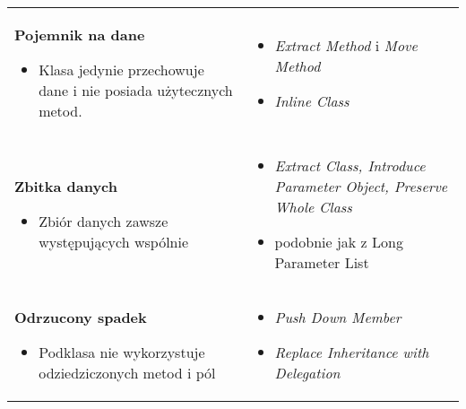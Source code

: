 \documentclass[../main.tex]{subfiles}
\begin{document}
    \begin{table}[H]
        \begin{center}
            \begin{tabular}{ p{.35\linewidth} p{.65\linewidth}}

                \cmidrule(r){1-1}\cmidrule(l){2-2}
                \textbf{Pojemnik na dane}
                \begin{itemize}
                    \item Klasa jedynie przechowuje dane i nie posiada użytecznych metod.
                \end{itemize}
                &
                \begin{itemize}
                    \item \textit{Extract Method} i \textit{Move Method}
                    \item \textit{Inline Class}
                \end{itemize}
                \\

                \cmidrule(r){1-1}\cmidrule(l){2-2}
                \textbf{Zbitka danych}
                \begin{itemize}
                    \item Zbiór danych zawsze występujących wspólnie
                \end{itemize}
                &
                \begin{itemize}
                    \item \textit{Extract Class, Introduce Parameter Object, Preserve Whole Class}
                    \item podobnie jak z Long Parameter List
                \end{itemize}
                \\

                \cmidrule(r){1-1}\cmidrule(l){2-2}
                \textbf{Odrzucony spadek}
                \begin{itemize}
                    \item Podklasa nie wykorzystuje odziedziczonych metod i pól
                \end{itemize}
                &
                \begin{itemize}
                    \item \textit{Push Down Member}
                    \item \textit{Replace Inheritance with Delegation}
                \end{itemize}
                \\


\end{tabular}
\end{center}
\end{table}
\end{document}
